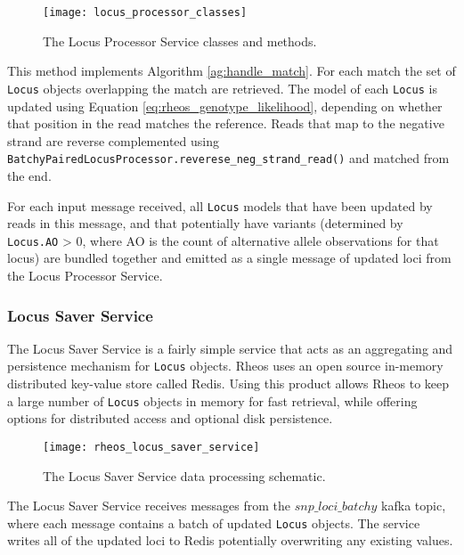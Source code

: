 \begin{figure}[h!]
    \texttt{[image: locus\_processor\_classes]}
    \centering
    \caption {The Locus Processor Service classes and methods.}
    \label{fig:locus_processor_classes}
\end{figure}

This method implements Algorithm \ref{ag:handle_match}. For each match the set of \texttt{Locus} objects overlapping the match are retrieved. The model of each \texttt{Locus} is updated using Equation \ref{eq:rheos_genotype_likelihood}, depending on whether that position in the read matches the reference. Reads that map to the negative strand are reverse complemented using \texttt{BatchyPairedLocusProcessor.reverese_neg_strand_read()} and matched from the end.

For each input message received, all \texttt{Locus} models that have been updated by reads in this message, and that potentially have variants (determined by \texttt{Locus.AO} > 0, where AO is the count of alternative allele observations for that locus) are bundled together and emitted as a single message of updated loci from the Locus Processor Service.

\subsubsection{Locus Saver Service}

The Locus Saver Service is a fairly simple service that acts as an aggregating and persistence mechanism for \texttt{Locus} objects. Rheos uses an open source in-memory distributed key-value store called Redis\autocite{carlson2013redis}. Using this product allows Rheos to keep a large number of \texttt{Locus} objects in memory for fast retrieval, while offering options for distributed access and optional disk persistence.

\begin{figure}[h!]
    \texttt{[image: rheos\_locus\_saver\_service]}
    \centering
    \caption {The Locus Saver Service data processing schematic.}
    \label{fig:rheos_locus_saver_service}
\end{figure}

The Locus Saver Service receives messages from the $snp\_loci\_batchy$ kafka topic, where each message contains a batch of updated \texttt{Locus} objects. The service writes all of the updated loci to Redis potentially overwriting any existing values.

